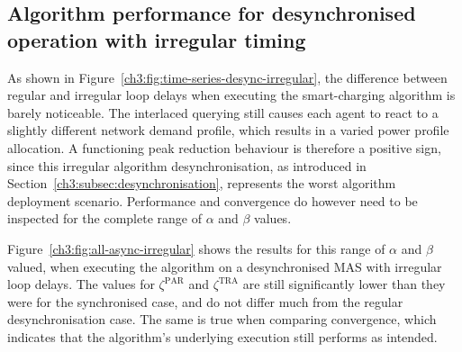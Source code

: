 \subsection{Algorithm performance for desynchronised operation with irregular timing}
\label{ch3:subsec:algorithm-performance-desynchronised-irregular}



As shown in Figure~\ref{ch3:fig:time-series-desync-irregular}, the difference between regular and irregular loop delays when executing the smart-charging algorithm is barely noticeable.
The interlaced querying still causes each agent to react to a slightly different network demand profile, which results in a varied power profile allocation.
A functioning peak reduction behaviour is therefore a positive sign, since this irregular algorithm desynchronisation, as introduced in Section~\ref{ch3:subsec:desynchronisation}, represents the worst algorithm deployment scenario.
Performance and convergence do however need to be inspected for the complete range of $\alpha$ and $\beta$ values.



Figure~\ref{ch3:fig:all-async-irregular} shows the results for this range of $\alpha$ and $\beta$ valued, when executing the algorithm on a desynchronised MAS with irregular loop delays.
The values for $\zeta^\text{PAR}$ and $\zeta^\text{TRA}$ are still significantly lower than they were for the synchronised case, and do not differ much from the regular desynchronisation case.
The same is true when comparing convergence, which indicates that the algorithm's underlying execution still performs as intended.



